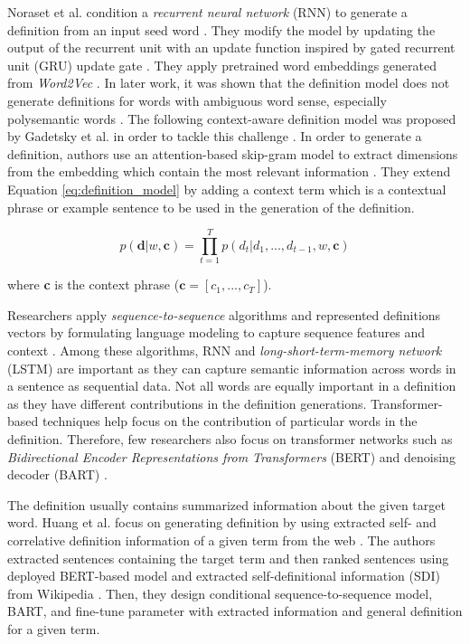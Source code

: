 Noraset et al. condition a \textit{recurrent neural network} (RNN) to generate a
definition from an input seed word \cite{noraset_definition_2016}. They modify
the model by updating the output of the recurrent unit with an update function
inspired by gated recurrent unit (GRU) update gate
\cite{noraset_definition_2016}. They apply pretrained word embeddings generated
from \textit{Word2Vec} \cite{mikolov_efficient_2013}. In later work, it was
shown that the definition model does not generate definitions for words with
ambiguous word sense, especially polysemantic words
\cite{gadetsky_conditional_2018}. The following context-aware definition model
was proposed by Gadetsky et al. in order to tackle this challenge
\cite{gadetsky_conditional_2018}. In order to generate a definition, authors use
an attention-based skip-gram model to extract dimensions from the embedding
which contain the most relevant information \cite{gadetsky_conditional_2018}.
They extend Equation \ref{eq:definition_model} by adding a context term which is
a contextual phrase or example sentence to be used in the generation of the
definition.

\begin{equation}
    \label{eq:context_aware_definition_model}
    p(\textbf{d} | w, \textbf{c}) = \prod_{t=1}^{T} p(d_t | d_1,...,d_{t-1}, w, \textbf{c})
\end{equation}

\noindent
where \textbf{c} is the context phrase ($\textbf{c} = [c_1, ..., c_T]$).

Researchers apply \textit{sequence-to-sequence} algorithms and represented
definitions vectors by formulating language modeling to capture sequence
features and context \cite{bevilacqua_generationary_2020, huang_cdm_2021,
    kabiri_evaluating_2020, washio_bridging_2019, reid_vcdm_2020}. Among these
algorithms, RNN and \textit{long-short-term-memory network} (LSTM) are important
as they can capture semantic information across words in a sentence as
sequential data. Not all words are equally important in a definition as they
have different contributions in the definition generations. Transformer-based
techniques help focus on the contribution of particular words in the definition.
Therefore, few researchers also focus on transformer networks such as
\textit{Bidirectional Encoder Representations from Transformers} (BERT) and
denoising decoder (BART) \cite{devlin2018bert, lewis2019bart}.

The definition usually contains summarized information about the given target
word. Huang et al. focus on generating definition by using extracted self- and
correlative definition information of a given term from the web
\cite{huang_cdm_2021}. The authors extracted sentences containing the target
term and then ranked sentences using deployed BERT-based model and extracted
self-definitional information (SDI) from Wikipedia \cite{huang_cdm_2021}. Then,
they design conditional sequence-to-sequence model, BART, and fine-tune
parameter with extracted information and general definition for a given term.

